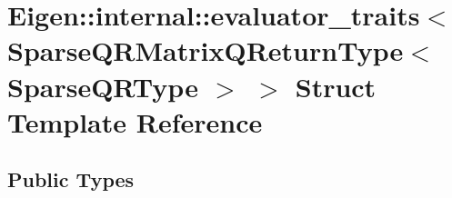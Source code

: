 \hypertarget{struct_eigen_1_1internal_1_1evaluator__traits_3_01_sparse_q_r_matrix_q_return_type_3_01_sparse_q_r_type_01_4_01_4}{}\section{Eigen\+:\+:internal\+:\+:evaluator\+\_\+traits$<$ Sparse\+Q\+R\+Matrix\+Q\+Return\+Type$<$ Sparse\+Q\+R\+Type $>$ $>$ Struct Template Reference}
\label{struct_eigen_1_1internal_1_1evaluator__traits_3_01_sparse_q_r_matrix_q_return_type_3_01_sparse_q_r_type_01_4_01_4}
\subsection*{Public Types}
